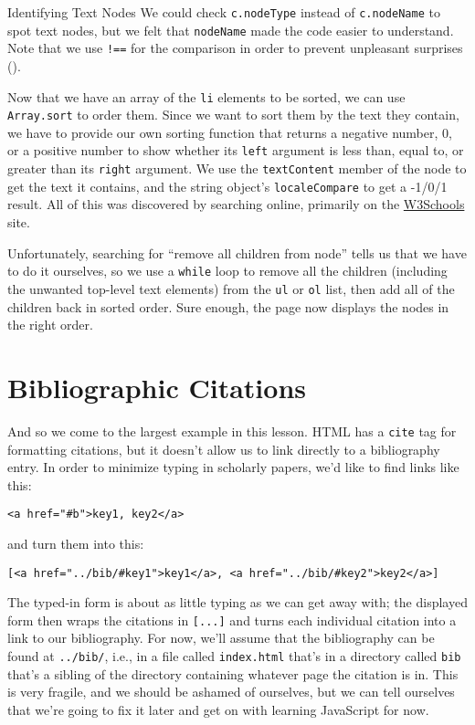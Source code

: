 \begin{aside}{Identifying Text Nodes}
  We could check \texttt{c.nodeType} instead of \texttt{c.nodeName} to spot text nodes,
  but we felt that \texttt{nodeName} made the code easier to understand.
  Note that we use \texttt{!==} for the comparison
  in order to prevent unpleasant surprises ().
\end{aside}

Now that we have an array of the \texttt{li} elements to be sorted,
we can use \texttt{Array.sort} to order them.
Since we want to sort them by the text they contain,
we have to provide our own sorting function
that returns a negative number, 0, or a positive number to show whether its \texttt{left} argument is less than,
equal to,
or greater than its \texttt{right} argument.
We use the \texttt{textContent} member of the node to get the text it contains,
and the string object's \texttt{localeCompare} to get a -1/0/1 result.
All of this was discovered by searching online,
primarily on the \href{https://www.w3schools.com/}{W3Schools} site.

Unfortunately,
searching for ``remove all children from node'' tells us that we have to do it ourselves,
so we use a \texttt{while} loop to remove all the children
(including the unwanted top-level text elements)
from the \texttt{ul} or \texttt{ol} list,
then add all of the children back in sorted order.
Sure enough,
the page now displays the nodes in the right order.

\section{Bibliographic Citations}\label{s:pages-citations}

And so we come to the largest example in this lesson.
HTML has a \texttt{cite} tag for formatting citations,
but it doesn't allow us to link directly to a bibliography entry.
In order to minimize typing in scholarly papers,
we'd like to find links like this:

\begin{verbatim}
<a href="#b">key1, key2</a>
\end{verbatim}

\noindent
and turn them into this:

\begin{verbatim}
[<a href="../bib/#key1">key1</a>, <a href="../bib/#key2">key2</a>]
\end{verbatim}

The typed-in form is about as little typing as we can get away with;
the displayed form then wraps the citations in \texttt{{[}...{]}}
and turns each individual citation into a link to our bibliography.
For now,
we'll assume that the bibliography can be found at \texttt{../bib/},
i.e.,
in a file called \texttt{index.html} that's in a directory called \texttt{bib}
that's a sibling of the directory containing whatever page the citation is in.
This is very fragile,
and we should be ashamed of ourselves,
but we can tell ourselves that we're going to fix it later
and get on with learning JavaScript for now.


